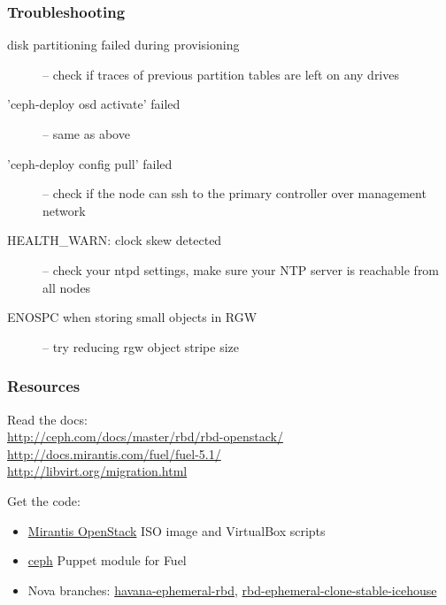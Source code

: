 \documentclass[hyperref=unicode,utf8,xcolor=pst,aspectratio=169]{beamer}
\begin{document}
\begin{frame}
	\frametitle{Troubleshooting}
	\begin{description}
		\item[disk partitioning failed during provisioning] --
			check if traces of previous partition tables are
			left on any drives
		\item['ceph-deploy osd activate' failed] -- same as above
		\item['ceph-deploy config pull' failed] -- check if the
			node can ssh to the primary controller over
			management network
		\item[HEALTH\_WARN: clock skew detected] -- check your
			ntpd settings, make sure your NTP server is
			reachable from all nodes
		\item[ENOSPC when storing small objects in RGW] -- try
			reducing rgw object stripe size
	\end{description}
\end{frame}

\begin{frame}
	\frametitle{Resources}
	Read the docs:\\
	\url{http://ceph.com/docs/master/rbd/rbd-openstack/}\\
	\url{http://docs.mirantis.com/fuel/fuel-5.1/}\\
	\url{http://libvirt.org/migration.html}

	\vspace{2ex}
	Get the code:\\
	\begin{itemize}
		\item \href{http://software.mirantis.com/}{Mirantis OpenStack} ISO image and VirtualBox scripts\\
		\item \href{https://github.com/stackforge/fuel-library/tree/master/deployment/puppet/ceph}{ceph} Puppet module for Fuel\\
		\item Nova branches: \href{https://github.com/jdurgin/nova/commits/havana-ephemeral-rbd}{havana-ephemeral-rbd},
			\href{https://github.com/angdraug/nova/commits/rbd-ephemeral-clone-stable-icehouse}{rbd-ephemeral-clone-stable-icehouse}
	\end{itemize}
\end{frame}
\end{document}
